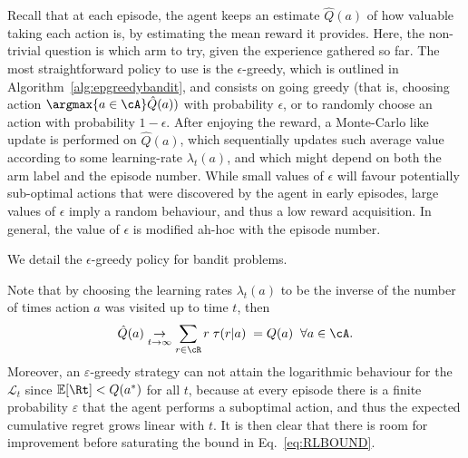 Recall that at each episode, the agent keeps an estimate $\hat{Q}(a)$ of how valuable taking each action is, by estimating the mean reward it provides. Here, the non-trivial question is which arm to try, given the experience gathered so far. The most straightforward policy to use is the $\epsilon$-greedy, which is outlined in Algorithm~\ref{alg:epgreedybandit}, and consists on going greedy (that is, choosing action $\argmax{a\in\cA}\hat{Q}(a))$ with probability $\epsilon$, or to randomly choose an action with probability $1-\epsilon$. After enjoying the reward, a Monte-Carlo like update is performed on $\hat{Q}(a)$,
which sequentially updates such average value according to some learning-rate $\lambda_t(a)$, and which might depend on both the arm label and the episode number. While small values of $\epsilon$ will favour potentially sub-optimal actions that were discovered by the agent in early episodes, large values of $\epsilon$ imply a random behaviour, and thus a low reward acquisition. In general, the value of $\epsilon$ is modified ah-hoc with the episode number.

\begin{algorithm}[H]\label{alg:epgreedybandit}
  \DontPrintSemicolon
  \SetAlgoNoEnd
  \Input{$\hat{Q}(a)$ arbitrarily initialized and learning rates $\lambda_{t}(a) \in (0, 1]$ $\forall a \in \cA\;$, $\epsilon \in (0,1]$}
\caption{We detail the $\epsilon$-greedy policy for bandit problems.}
\end{algorithm}
Note that by choosing the learning rates $\lambda_t(a)$ to be the inverse of the number of times action $a$ was visited up to time $t$, then
\begin{equation}
   \hat{Q}(a)  \underset{t \rightarrow \infty}{\rightarrow} \sum_{r \in \cR} r \; \tau(r|a) \; = Q(a) \; \; \forall a \in \cA.
   \label{eq:Qband}
\end{equation}
Moreover, an $\varepsilon$-greedy strategy can not attain the logarithmic behaviour for the $\mathcal{L}_t$ since $\mathbb{E}[ \Rt]<Q(a^{*})$ for all $t$, because at every episode there is a finite probability $\varepsilon$ that the agent performs a suboptimal action, and thus the expected cumulative regret grows linear with $t$. It is then clear that there is room for improvement before saturating the bound in Eq.~\eqref{eq:RLBOUND}.

